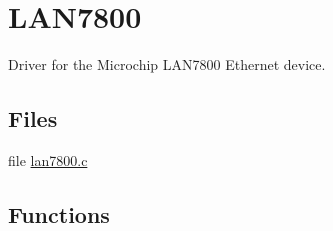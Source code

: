 \hypertarget{group__lan7800}{\section{L\-A\-N7800}
\label{group__lan7800}
}


Driver for the Microchip L\-A\-N7800 Ethernet device.  


\subsection*{Files}
\begin{DoxyCompactItemize}
\item 
file \hyperlink{lan7800_8c}{lan7800.\-c}
\end{DoxyCompactItemize}
\subsection*{Functions}
